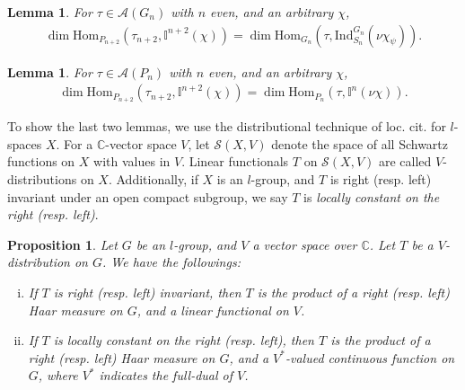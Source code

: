 \documentclass[11pt]{amsart}
\newcommand\C{{\mathbb{C}}}%
\newcommand\Ib{{\mathbb{I}}}
\newcommand\Ss{{\mathscr{S}}}
\newcommand\1{\mathbf{1}}
\newcommand\nid{\noindent}
\newcommand\In{{\mathrm{Ind}}}%
\newcommand\Hom{{\mathrm{Hom}}}%
\newcommand\Alg{{\mathscr{A}}}
\numberwithin{equation}{section}
\newtheorem{prop}[thm]{Proposition}
\newtheorem{lem}[thm]{Lemma}
\begin{document}
\begin{lem}\label{lem:inGchi}
For $\tau \in \Alg(G_{n})$ with $n$ even, and an arbitrary $\chi$, 
\begin{align*}
\dim \Hom_{P_{n+2}}(\tau_{n+2}, \Ib^{n+2}(\chi))= \dim \Hom_{G_{n}}(\tau, \In_{S_{n}}^{G_{n}}(\nu\chi_\psi)).
\end{align*} 
\end{lem}
\begin{lem}\label{lem:delta2}
For $\tau \in \Alg(P_{n})$ with $n$ even, and an arbitrary $\chi$, 
\begin{align*}
\dim \Hom_{P_{n+2}}(\tau_{n+2}, \Ib^{n+2}(\chi)) = \dim \Hom_{P_{n}}(\tau, \Ib^{n}(\nu\chi)).
\end{align*} 
\end{lem}
\nid
To show the last two lemmas, we use the distributional technique of loc. cit. for $l$-spaces $X$.
For a $\C$-vector space $V$, let $\Ss(X,V)$ denote the space of all Schwartz functions on $X$ with values in $V$.
Linear functionals $T$ on $\Ss(X,V)$ are called $V$-distributions on $X$.
Additionally, if $X$ is an $l$-group, and $T$ is right (resp. left) invariant under an open compact subgroup, we say $T$ is {\it locally constant on the right (resp. left)}.
\begin{prop}\label{prop:distprod}
Let $G$ be an $l$-group, and $V$ a vector space over $\C$.
Let $T$ be a $V$-distribution on $G$.
We have the followings:
\begin{enumerate}[i)]
\item If $T$ is right (resp. left) invariant, then $T$ is the product of a right (resp. left) Haar measure on $G$, and a linear functional on $V$.
\item If $T$ is locally constant on the  right (resp. left), then $T$ is the product of a right (resp. left) Haar measure on $G$, and a $V^*$-valued continuous function on $G$, where $V^*$ indicates the full-dual of $V$.
\end{enumerate}
\end{prop}
\end{document}
